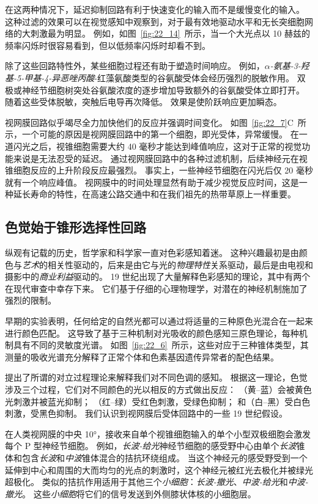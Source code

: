 在这两种情况下，延迟抑制回路有利于快速变化的输入而不是缓慢变化的输入。
这种过滤的效果可以在视觉感知中观察到，对于最有效地驱动水平和无长突细胞网络的大刺激最为明显。
例如，如图~\ref{fig:22_14}~所示，当一个大光点以 10 赫兹的频率闪烁时很容易看到，但以低频率闪烁时却看不到。


除了这些回路特性外，某些细胞过程还有助于塑造时间响应。
例如，\textit{$\alpha$-氨基-3-羟基-5-甲基-4-异恶唑丙酸}-红藻氨酸类型的谷氨酸受体会经历强烈的脱敏作用。
双极或神经节细胞树突处谷氨酸浓度的逐步增加导致额外的谷氨酸受体立即打开。
随着这些受体脱敏，突触后电导再次降低。
效果是使阶跃响应更加瞬态。


视网膜回路似乎竭尽全力加快他们的反应并强调时间变化。
如图~\ref{fig:22_7}C~所示，一个可能的原因是视网膜回路中的第一个细胞，即光受体，异常缓慢。
在一道闪光之后，视锥细胞需要大约 40 毫秒才能达到峰值响应，这对于正常的视觉功能来说是无法忍受的延迟。
通过视网膜回路中的各种过滤机制，后续神经元在视锥细胞反应的上升阶段反应最强烈。
事实上，一些神经节细胞在闪光后仅 20 毫秒就有一个响应峰值。
视网膜中的时间处理显然有助于减少视觉反应时间，这是一种延长寿命的特性，在高速公路交通中和在我们祖先的热带草原上一样重要。



\subsection{色觉始于锥形选择性回路}

纵观有记载的历史，哲学家和科学家一直对色彩感知着迷。
这种兴趣最初是由颜色与\textit{艺术}的相关性驱动的，后来是由它与光的\textit{物理特性}关系驱动，最后是由电视和摄影中的\textit{商业利益}驱动的。
19 世纪出现了大量解释色彩感知的理论，其中有两个在现代审查中幸存下来。
它们基于仔细的心理物理学，对潜在的神经机制施加了强烈的限制。


早期的实验表明，任何给定的自然光都可以通过将适量的三种原色光混合在一起来进行颜色匹配。
这导致了基于三种机制对光吸收的颜色感知三原色理论，每种机制具有不同的灵敏度光谱。
如图~\ref{fig:22_6}~所示，这些对应于三种锥体类型，其测量的吸收光谱充分解释了正常个体和色素基因遗传异常者的配色结果。


提出了所谓的对立过程理论来解释我们对不同色调的感知。
根据这一理论，色觉涉及三个过程，它们对不同颜色的光以相反的方式做出反应：
（黄–蓝）会被黄色光刺激并被蓝光抑制；
（红–绿）受红色刺激，受绿色抑制；
和（白–黑）受白色刺激，受黑色抑制。
我们认识到视网膜后受体回路中的一些 19 世纪假设。


在人类视网膜的中央 10°，接收来自单个视锥细胞输入的单个小型双极细胞会激发每个 P 型神经节细胞。
例如，\textit{长波-给光}神经节细胞的感受野中心由单个\textit{长波}锥体和包含\textit{长波}和\textit{中波}锥体混合的拮抗环绕组成。
当这个神经元的感受野受到一个延伸到中心和周围的大而均匀的光点的刺激时，这个神经元被红光去极化并被绿光超极化。
类似的拮抗作用适用于其他三个\textit{小细胞}：\textit{长波-撤光}、\textit{中波-给光}和\textit{中波-撤光}。
这些\textit{小细胞}将它们的信号发送到外侧膝状体核的小细胞层。



